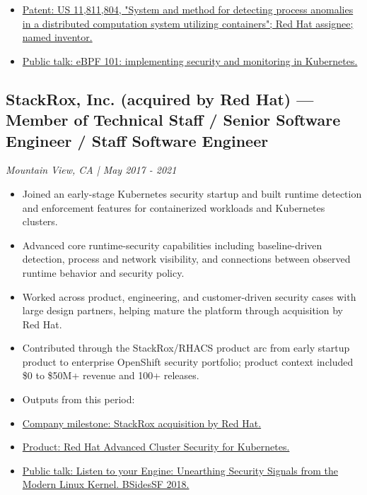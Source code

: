 \documentclass[10pt,letterpaper]{article}
\begin{document}
\begin{itemize}
  \item \href{https://patents.justia.com/patent/11811804}{Patent: US 11,811,804, "System and method for detecting process anomalies in a distributed computation system utilizing containers"; Red Hat assignee; named inventor.}

  \item \href{https://speakerdeck.com/redhatlivestreaming/stackrox-community-office-hours-e2-ebpf-101-implementing-security-and-monitoring-kubernetes}{Public talk: eBPF 101: implementing security and monitoring in Kubernetes.}

\end{itemize}

\subsection*{StackRox, Inc. (acquired by Red Hat) — Member of Technical Staff / Senior Software Engineer / Staff Software Engineer}

\emph{Mountain View, CA | May 2017 - 2021}

\begin{itemize}

  \item Joined an early-stage Kubernetes security startup and built runtime detection and enforcement features for containerized workloads and Kubernetes clusters.

  \item Advanced core runtime-security capabilities including baseline-driven detection, process and network visibility, and connections between observed runtime behavior and security policy.

  \item Worked across product, engineering, and customer-driven security cases with large design partners, helping mature the platform through acquisition by Red Hat.

  \item Contributed through the StackRox/RHACS product arc from early startup product to enterprise OpenShift security portfolio; product context included \$0 to \$50M+ revenue and 100+ releases.

  \item Outputs from this period:

  \item \href{https://www.redhat.com/en/blog/faq-red-hat-acquire-stackrox}{Company milestone: StackRox acquisition by Red Hat.}

  \item \href{https://www.redhat.com/en/technologies/cloud-computing/openshift/advanced-cluster-security-kubernetes}{Product: Red Hat Advanced Cluster Security for Kubernetes.}

  \item \href{https://www.youtube.com/watch?v=LFqWl7XB5Gc}{Public talk: Listen to your Engine: Unearthing Security Signals from the Modern Linux Kernel. BSidesSF 2018.}

\end{itemize}
\end{document}
